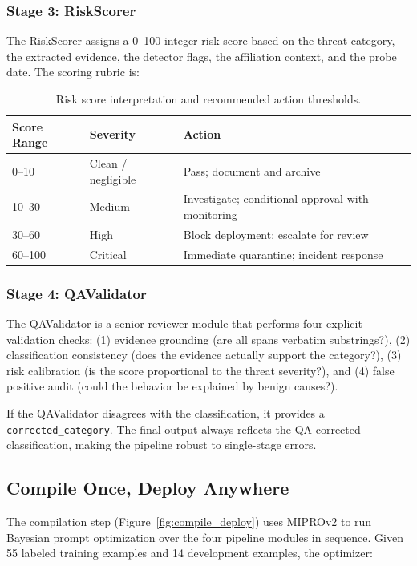 \documentclass[11pt]{article}
\begin{document}
\subsubsection{Stage 3: RiskScorer}

The RiskScorer assigns a 0--100 integer risk score based on the threat
category, the extracted evidence, the detector flags, the affiliation
context, and the probe date. The scoring rubric is:

\begin{table}[h!]
\centering
\begin{tabular}{@{}lll@{}}
\toprule
Score Range & Severity & Action \\
\midrule
0--10   & Clean / negligible  & Pass; document and archive \\
10--30  & Medium              & Investigate; conditional approval with monitoring \\
30--60  & High                & Block deployment; escalate for review \\
60--100 & Critical            & Immediate quarantine; incident response \\
\bottomrule
\end{tabular}
\caption{Risk score interpretation and recommended action thresholds.}
\label{tab:risk}
\end{table}

\subsubsection{Stage 4: QAValidator}

The QAValidator is a senior-reviewer module that performs four explicit
validation checks: (1) evidence grounding (are all spans verbatim substrings?),
(2) classification consistency (does the evidence actually support the category?),
(3) risk calibration (is the score proportional to the threat severity?),
and (4) false positive audit (could the behavior be explained by benign causes?).

If the QAValidator disagrees with the classification, it provides a
\texttt{corrected\_category}. The final output always reflects the
QA-corrected classification, making the pipeline robust to single-stage
errors.

\subsection{Compile Once, Deploy Anywhere}

The compilation step (Figure~\ref{fig:compile_deploy}) uses MIPROv2 to
run Bayesian prompt optimization over the four pipeline modules in sequence.
Given 55 labeled training examples and 14 development examples, the optimizer:
\end{document}
